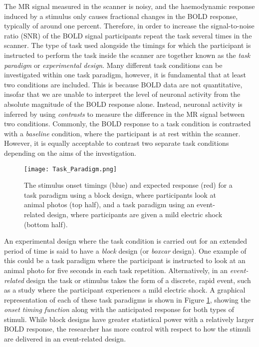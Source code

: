 The MR signal measured in the scanner is noisy, and the haemodynamic response induced by a stimulus only causes fractional changes in the BOLD response, typically of around one percent. Therefore, in order to increase the signal-to-noise ratio (SNR) of the BOLD signal participants repeat the task several times in the scanner. The type of task used alongside the timings for which the participant is instructed to perform the task inside the scanner are together known as the \textit{task paradigm} or \textit{experimental design}. Many different task conditions can be investigated within one task paradigm, however, it is fundamental that at least two conditions are included. This is because BOLD data are not quantitative, insofar that we are unable to interpret the level of neuronal activity from the absolute magnitude of the BOLD response alone. Instead, neuronal activity is inferred by using \textit{contrasts} to measure the difference in the MR signal between two conditions. Commonly, the BOLD response to a task condition is contrasted with a \textit{baseline} condition, where the participant is at rest within the scanner. However, it is equally acceptable to contrast two separate task conditions depending on the aims of the investigation. 

\begin{figure}[!ht] 
\centering
	\texttt{[image: Task\_Paradigm.png]}
\caption{The stimulus onset timings (blue) and expected response (red) for a task paradigm using a block design, where participants look at animal photos (top half), and a task paradigm using an event-related design, where participants are given a mild electric shock (bottom half).}
\label{fig:paradigm}
\end{figure}

An experimental design where the task condition is carried out for an extended period of time is said to have a \textit{block} design (or \textit{boxcar} design). One example of this could be a task paradigm where the participant is instructed to look at an animal photo for five seconds in each task repetition. Alternatively, in an \textit{event-related} design the task or stimulus takes the form of a discrete, rapid event, such as a study where the participant experiences a mild electric shock. A graphical representation of each of these task paradigms is shown in Figure \ref{fig:paradigm}, showing the \textit{onset timing function} along with the anticipated response for both types of stimuli. While block designs have greater statistical power with a relatively larger BOLD response, the researcher has more control with respect to how the stimuli are delivered in an event-related design. 

